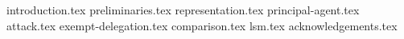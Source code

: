 {introduction.tex}
{preliminaries.tex}
{representation.tex}
{principal-agent.tex}
{attack.tex}
{exempt-delegation.tex}
{comparison.tex}
{lsm.tex}
\ifanonymous\else
{acknowledgements.tex}
\fi
